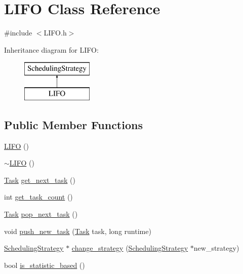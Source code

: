 \hypertarget{class_l_i_f_o}{}\section{L\+I\+F\+O Class Reference}
\label{class_l_i_f_o}


{\ttfamily \#include $<$L\+I\+F\+O.\+h$>$}

Inheritance diagram for L\+I\+F\+O\+:\begin{figure}[H]
\begin{center}
\leavevmode
\includegraphics[height=2.000000cm]{class_l_i_f_o}
\end{center}
\end{figure}
\subsection*{Public Member Functions}
\begin{DoxyCompactItemize}
\item 
\hyperlink{class_l_i_f_o_a594555175f097e6cf98db278d695dd6f}{L\+I\+F\+O} ()
\item 
\hyperlink{class_l_i_f_o_af8722c4d9d050eddf9e17714d5d90594}{$\sim$\+L\+I\+F\+O} ()
\item 
\hyperlink{_types_8h_a0c77930ab3818a1680c59353f627fba8}{Task} \hyperlink{class_l_i_f_o_a53eb12a8a25f0fb4f57679206bf314dc}{get\+\_\+next\+\_\+task} ()
\item 
int \hyperlink{class_l_i_f_o_a6368d6fe156688f38d06a0ee75d57ef6}{get\+\_\+task\+\_\+count} ()
\item 
\hyperlink{_types_8h_a0c77930ab3818a1680c59353f627fba8}{Task} \hyperlink{class_l_i_f_o_a1593c380d2f3f0e8f2247a2b61c9607c}{pop\+\_\+next\+\_\+task} ()
\item 
void \hyperlink{class_l_i_f_o_a422ac5b308521b23e97c25f7fc80ee7c}{push\+\_\+new\+\_\+task} (\hyperlink{_types_8h_a0c77930ab3818a1680c59353f627fba8}{Task} task, long runtime)
\item 
\hyperlink{class_scheduling_strategy}{Scheduling\+Strategy} $\ast$ \hyperlink{class_l_i_f_o_a6e3553527c29e2c90bf86d4a4e5cd570}{change\+\_\+strategy} (\hyperlink{class_scheduling_strategy}{Scheduling\+Strategy} $\ast$new\+\_\+strategy)
\item 
bool \hyperlink{class_l_i_f_o_a8a8a3203290cda8521b74acde5fc334d}{is\+\_\+statistic\+\_\+based} ()
\end{DoxyCompactItemize}
